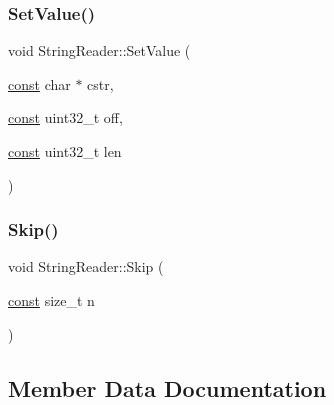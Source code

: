 \subsubsection{\texorpdfstring{Set\+Value()}{SetValue()}\hspace{0.1cm}{\footnotesize\ttfamily [4/4]}}
{\footnotesize\ttfamily void String\+Reader\+::\+Set\+Value (\begin{DoxyParamCaption}\item[{\mbox{\hyperlink{ZlibCrc32_8h_a2c212835823e3c54a8ab6d95c652660e}{const}} char $\ast$}]{cstr,  }\item[{\mbox{\hyperlink{ZlibCrc32_8h_a2c212835823e3c54a8ab6d95c652660e}{const}} uint32\+\_\+t}]{off,  }\item[{\mbox{\hyperlink{ZlibCrc32_8h_a2c212835823e3c54a8ab6d95c652660e}{const}} uint32\+\_\+t}]{len }\end{DoxyParamCaption})}

\mbox{\label{classlucene_1_1core_1_1analysis_1_1StringReader_a745fa855b7308d2c08e289751590cdc7}} 
\subsubsection{\texorpdfstring{Skip()}{Skip()}}
{\footnotesize\ttfamily void String\+Reader\+::\+Skip (\begin{DoxyParamCaption}\item[{\mbox{\hyperlink{ZlibCrc32_8h_a2c212835823e3c54a8ab6d95c652660e}{const}} size\+\_\+t}]{n }\end{DoxyParamCaption})\hspace{0.3cm}{\ttfamily [override]}}



\subsection{Member Data Documentation}
\mbox{\label{classlucene_1_1core_1_1analysis_1_1StringReader_ada023622e5d849d9fe8e9fcb838af328}} 
